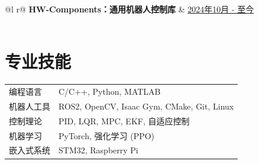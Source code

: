\documentclass[a4paper,12pt]{article}
\begin{document}
\begin{tabularx}{\linewidth}{ @{}l r@{} }
\textbf{HW-Components：通用机器人控制库} & \hfill \href{https://vamperd.github.io/project/}{2024年10月 - 至今} \\[3.75pt]
  \\
\end{tabularx}


\section{专业技能}
\begin{tabularx}{\linewidth}{@{}l X@{}}
编程语言 & \normalsize{C/C++, Python, MATLAB}\\
机器人工具 & \normalsize{ROS2, OpenCV, Isaac Gym, CMake, Git, Linux}\\
控制理论 & \normalsize{PID, LQR, MPC, EKF, 自适应控制}\\
机器学习 & \normalsize{PyTorch, 强化学习 (PPO)}\\
嵌入式系统 & \normalsize{STM32, Raspberry Pi}\\
\end{tabularx}

\end{document}
